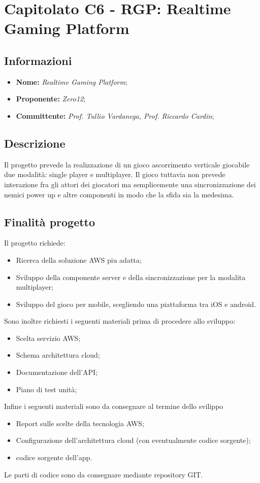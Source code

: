 \section{Capitolato C6 - RGP: Realtime Gaming Platform}
\subsection{Informazioni}
\begin{itemize}
    \item \textbf{Nome:} \textit{Realtime Gaming Platform}; 
    \item \textbf{Proponente:} \textit{Zero12};
    \item \textbf{Committente:} \textit{Prof. Tullio Vardanega, Prof. Riccardo Cardin};
\end{itemize}
\subsection{Descrizione}
Il progetto prevede la realizzazione di un gioco ascorrimento verticale giocabile due modalit\`a: single player e multiplayer. Il gioco tuttavia non prevede interazione fra gli attori dei giocatori ma semplicemente una sincronizzazione dei nemici power up e altre componenti in modo che la sfida sia la medesima.
\subsection{Finalit\`a progetto}
Il progetto richiede:
\begin{itemize}
    \item Ricerca della soluzione AWS piu adatta;
    \item Sviluppo della componente server e della sincronizzazione per la modalita multiplayer;
    \item Sviluppo del gioco per mobile, scegliendo una piattaforma tra iOS e android.
\end{itemize}
Sono inoltre richiesti i seguenti materiali prima di procedere allo sviluppo:
\begin{itemize}
    \item Scelta servizio AWS;
    \item Schema architettura cloud;
    \item Documentazione dell'API;
    \item Piano di test unit\`a;
\end{itemize}
Infine i seguenti materiali sono da consegnare al termine dello svilippo
\begin{itemize}
    \item Report sulle scelte della tecnologia AWS;
    \item Configurazione dell'architettura cloud (con eventualmente codice sorgente);
    \item codice sorgente dell'app.
\end{itemize}
Le parti di codice sono da consegnare mediante repository GIT.
